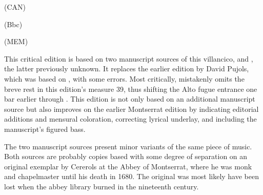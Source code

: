 
\begin{notesources}

\item (CAN)

\item (Bbc)

\item (MEM)

\end{notesources}

This critical edition is based on two manuscript sources of this villancico,  and , the latter previously unknown.
It replaces the earlier edition by David Pujols, which was based on , with some errors.
Most critically,  mistakenly omits the breve rest in this edition's measure 39, thus shifting the Alto fugue entrance one bar earlier through .
This edition is not only based on an additional manuscript source but also improves on the earlier Montserrat edition by indicating editorial additions and mensural coloration, correcting lyrical underlay, and including the manuscript's figured bass.

The two manuscript sources present minor variants of the same piece of music.
Both sources are probably copies based with some degree of separation on an original exemplar by Cererols at the Abbey of Montserrat, where he was monk and chapelmaster until his death in 1680.
The original was most likely have been lost when the abbey library burned in the nineteenth century.

